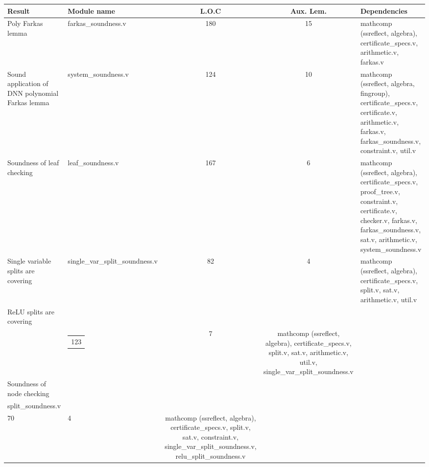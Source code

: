 \begin{table}[ht]
\label{tab:rocq-formal-results}
\centering
\scriptsize
\begin{tabularx}{\textwidth}{
    @{}
    p{}
    p{}
    c
    c
    X
    @{}}
\toprule
\textbf{Result} &
\textbf{Module name} &
\textbf{L.O.C} &
\textbf{Aux. Lem.} &
\textbf{Dependencies} \\
\midrule

Poly Farkas lemma
&
farkas\_soundness.v
&
180
&
15
&
mathcomp (ssreflect, algebra),
certificate\_specs.v,
arithmetic.v, farkas.v
\\
\midrule

Sound application of DNN polynomial Farkas lemma
&
system\_soundness.v
&
124
&
10
&
mathcomp (ssreflect, algebra, fingroup),
certificate\_specs.v, certificate.v,
arithmetic.v, farkas.v,
farkas\_soundness.v, constraint.v,
util.v
\\
\midrule

Soundness of leaf checking
&
leaf\_soundness.v
&
167
&
6
&
mathcomp (ssreflect, algebra),
certificate\_specs.v, proof\_tree.v,
constraint.v, certificate.v,
checker.v, farkas.v,
farkas\_soundness.v, sat.v,
arithmetic.v, system\_soundness.v
\\
\midrule

Single variable splits are covering
&
single\_var\_split\_soundness.v
&
82
&
4
&
mathcomp (ssreflect, algebra),
certificate\_specs.v, split.v,
sat.v, arithmetic.v, util.v
\\
\midrule

ReLU splits are covering
&
\begin{tabular}[t]{@{}l@{}}
relu\_split\_soundness.v\\
\end{tabular}
&
\begin{tabular}[t]{@{}c@{}}
123
\end{tabular}
&
7
&
mathcomp (ssreflect, algebra),
certificate\_specs.v, split.v,
sat.v, arithmetic.v, util.v,
single\_var\_split\_soundness.v
\\
\midrule

Soundness of node checking
&
\begin{tabular}[t]{@{}l@{}}
node\_soundness.v\\
split\_soundness.v
\end{tabular}
&
\begin{tabular}[t]{@{}c@{}}
68\\
70
\end{tabular}
&
4
&
mathcomp (ssreflect, algebra),
certificate\_specs.v, split.v,
sat.v, constraint.v,
single\_var\_split\_soundness.v,
relu\_split\_soundness.v
\\
\midrule


\end{tabularx}
\end{table}
